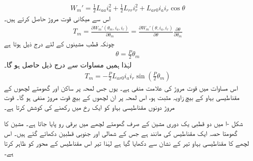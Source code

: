 \begin{align}
W_m'=\frac{1}{2} L_{aa} i_a^2+\frac{1}{2} L_{rr} i_r^2+L_{ar0} i_a i_r \cos \theta
\end{align}
اس سے میکانی قوت مروڑ  حاصل کرتے ہیں۔
\begin{align}\label{مساوات_گھومتے_مشین_مروڑ_بذریعہ_توانائی}
T_m=\frac{\partial W_m'(\theta_m,i_a,i_r)}{\partial \theta_m}=\frac{\partial W_m'(\theta,i_a,i_r)}{\partial \theta} \frac{\partial \theta}{\partial \theta_m}
\end{align}
چونکہ  قطب مشینوں کے لئے درج ذیل ہوتا ہے
\begin{align}
\theta=\frac{P}{2} \theta_m
\end{align}
لہٰذا ہمیں مساوات   سے درج ذیل حاصل ہو گا۔
\begin{align}\label{مساوات_گھومتے_مشین_مروڑ_بذریعہ_کوتوانائی}
T_m=-\frac{P}{2} L_{ar0} i_a i_r \sin \left(\frac{P}{2} \theta_m\right)
\end{align}
اس مساوات میں قوت مروڑ  کی علامت منفی ہے۔ یوں جس لمحہ پر ساکن اور گھومتے لچھوں کے مقناطیسی بہاو کے بیچ  زاویہ مثبت ہو، اس لمحہ پر ان لچھوں کے بیچ قوت مروڑ منفی ہو گا۔  قوت مروڑ  دونوں مقناطیسی بہاو کو ایک رخ میں رکھنے کی کوشش کرتا ہے۔

شکل -ا  میں دو قطبی یک دوری مشین کے صرف گھومتے لچھے میں برقی رو پایا جاتا ہے۔   مشین کا  گھومتا حصہ  ایک مقناطیس کی مانند ہے جس کے شمالی اور جنوبی قطبین دکھائے گئے ہیں۔ اس لچھے کا مقناطیسی بہاو تیر کے نشان سے دکھایا گیا ہے لہٰذا  تیر اس مقناطیس کے محور کو ظاہر کرتا ہے۔

